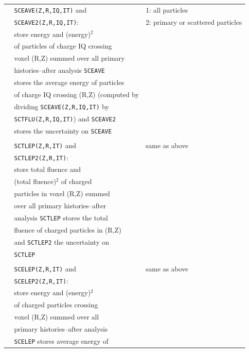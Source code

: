 \documentclass[12pt,twoside]{article}  %
\begin{document}
\begin{longtable}{lll}
         & {\tt SCEAVE(Z,R,IQ,IT)} and & 1: all particles\\
         & {\tt SCEAVE2(Z,R,IQ,IT)}: & 2: primary  or scattered particles \\
         & store energy and (energy)$^2$ &\\
         & of particles of charge IQ crossing &\\
         & voxel (R,Z) summed over all primary &\\
         & histories--after analysis {\tt SCEAVE} &\\
         & stores the average energy of particles&\\
         & of charge IQ crossing (R,Z) (computed by&\\
         & dividing {\tt SCEAVE(Z,R,IQ,IT)} by &\\
         & {\tt SCTFLU(Z,R,IQ,IT)}) and {\tt SCEAVE2}&\\
         & stores the uncertainty on {\tt SCEAVE} &\\
         &&\\
         & {\tt SCTLEP(Z,R,IT)} and & same as above\\
         & {\tt SCTLEP2(Z,R,IT)}: & \\
         & store total fluence and & \\
         & (total fluence)$^2$ of charged &\\
         & particles in voxel (R,Z) summed &\\
         & over all primary histories--after&\\
         & analysis {\tt SCTLEP} stores the total&\\
         & fluence of charged particles in (R,Z)&\\
         & and {\tt SCTLEP2} the uncertainty on&\\
         & {\tt SCTLEP}&\\
         &&\\
         & {\tt SCELEP(Z,R,IT)} and & same as above\\
         & {\tt SCELEP2(Z,R,IT)}: & \\
         & store energy and (energy)$^2$ &\\
         & of charged particles crossing &\\
         & voxel (R,Z) summed over all &\\
         & primary histories--after analysis &\\
         & {\tt SCELEP} stores average energy of &\\

\end{longtable}
\end{document}
